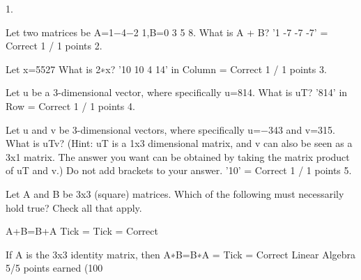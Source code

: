 1.

Let two matrices be A=1−4−2 1,B=0 3 5 8. What is A + B? '1 -7 -7 -7' = Correct 1 / 1 points
2. 

Let x=5527 What is 2∗x? '10 10 4 14' in Column = Correct 1 / 1 points
3. 

Let u be a 3-dimensional vector, where specifically u=814. What is uT? '814' in Row = Correct 1 / 1 points
4. 

Let u and v be 3-dimensional vectors, where specifically u=−343 and v=315.
What is uTv? (Hint: uT is a 1x3 dimensional matrix, and v can also be seen as a 3x1 matrix. The answer you want can be obtained by taking the matrix product of uT and v.) Do not add brackets to your answer. '10' = Correct 1 / 1 points
5. 

Let A and B be 3x3 (square) matrices. Which of the following must necessarily hold true? Check all that apply.

A+B=B+A Tick = Tick = Correct 

If A is the 3x3 identity matrix, then A∗B=B∗A = Tick = Correct  
Linear Algebra
5/5 points earned (100%
